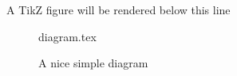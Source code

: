 \documentclass[class=article, crop=false]{standalone}
\begin{document}
A TikZ figure will be rendered below this line

\begin{figure}[ht]

{diagram.tex}
\caption{A nice simple diagram}
\label{fig:tikzexample}

\end{figure}
\end{document}
